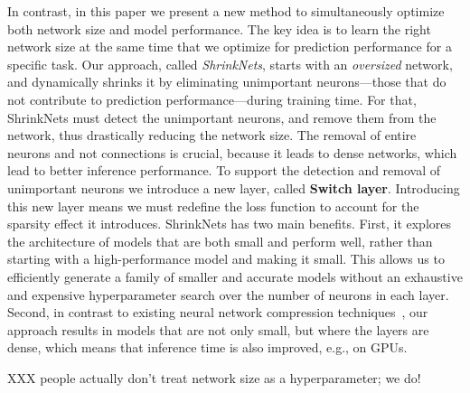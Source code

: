 In contrast, in this paper we present a new method to simultaneously optimize
both network size and model performance. The key idea is to learn the right
network size at the same time that we optimize for prediction performance for a
specific task. Our approach, called {\it ShrinkNets}, starts with an {\it
oversized} network, and dynamically shrinks it by eliminating unimportant
neurons---those that do not contribute to prediction performance---during
training time. For that, ShrinkNets must detect the unimportant neurons, and
remove them from the network, thus drastically reducing the network size. The
removal of entire neurons and not connections is crucial, because it leads to
dense networks, which lead to better inference performance. To support the
detection and removal of unimportant neurons we introduce a new layer, called
\textbf{Switch layer}. Introducing this new layer means we must redefine the
loss function to account for the sparsity effect it introduces. ShrinkNets has
two main benefits. First, it explores the architecture of models that are both
small and perform well, rather than starting with a high-performance model and
making it small.  This allows us to efficiently generate a family of smaller and
accurate models without an exhaustive and expensive hyperparameter search over
the number of neurons in each layer.  Second, in contrast to existing neural
network compression techniques~\cite{Aghasi2016,han2015deepcompression}, our
approach results in models that are not only small, but where the layers are
dense, which means that inference time is also improved, e.g., on GPUs.





XXX people actually don't treat network size as a hyperparameter;  we do!


